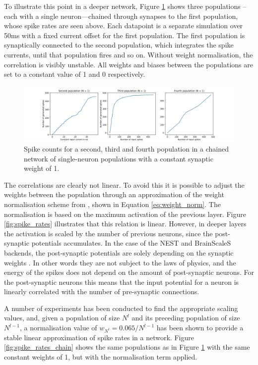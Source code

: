 To illustrate this point in a deeper network, Figure
\ref{fig:spike_rates_not_weighted} shows
three populations
--each with a single neuron---chained
through synapses to the first population, whose spike rates are seen above.
Each datapoint is a separate simulation over 50ms with a fixed
current offset for the first population.
The first population is synaptically connected to the second population, which 
integrates the spike currents, until that population fires and so on.
Without weight normalisation, the correlation is visibly unstable.
All weights and biases between the populations are set to a constant value of 1
and 0 respectively.

\begin{figure}
  \includegraphics[width=\linewidth]{images/spike_rate_not_weighted.png}
  \caption{Spike counts for a second, third and fourth population in a chained network of
  single-neuron populations with a constant synaptic weight of 1.}
  \label{fig:spike_rates_not_weighted}
\end{figure}

The correlations are clearly not linear.
To avoid this it is possible to adjust the weights between the population
through an approximation of
the weight normalisation scheme from \textcite{Rueckauer2017}, shown in Equation
\ref{eq:weight_norm}.
The normalisation is based on the maximum activation of the previous layer.
Figure \ref{fig:spike_rates} illustrates that this relation is linear.
However, in deeper layers the activation is scaled by the number of previous
neurons, since the post-synaptic potentials accumulates.
In the case of the NEST and BrainScaleS backends,
the post-synaptic potentials are solely depending on the synaptic weights
\cite{Gewaltig2007, Schmitt2017}.
In other words they are not subject to the laws of physics, and
the energy of the spikes does not depend on the amount of post-synaptic
neurons.
For the post-synaptic neurons this means that the input potential for a neuron
is linearly correlated with the number of pre-synaptic connections.

A number of experiments has been conducted to find the appropriate scaling values,
and, given a population of size $N^l$ and its preceding population of size $N^{l-1}$,
a normalisation value of $w_{N^l} = 0.065 / N^{l-1}$
has been shown to provide a stable linear approximation of spike rates in a
network.
Figure \ref{fig:spike_rates_chain} shows the same populations as in 
Figure \ref{fig:spike_rates_not_weighted} with the same constant weights of 1, but with
the normalisation term applied.

